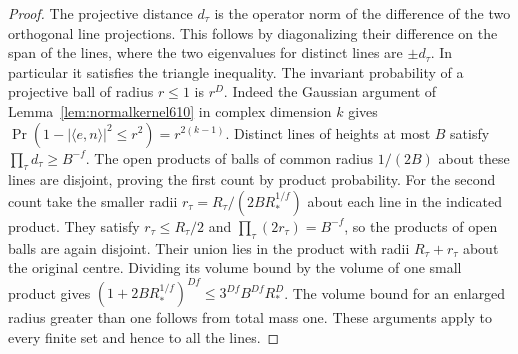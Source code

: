 \documentclass[a4paper,11pt]{article}
\theoremstyle{definition}
\theoremstyle{remark}
\numberwithin{equation}{section}
\begin{document}
\begin{proof}
The projective distance \(d_\tau\) is the operator norm of the
difference of the two orthogonal line projections. This follows
by diagonalizing their difference on the span of the lines,
where the two eigenvalues for distinct lines are \(\pm d_\tau\).
In particular it satisfies the triangle inequality. The invariant
probability of a projective ball of radius \(r\le1\) is \(r^D\).
Indeed the Gaussian argument of Lemma~\ref{lem:normalkernel610}
in complex dimension \(k\) gives
\(\Pr(1-|\langle e,n\rangle|^2\le r^2)=r^{2(k-1)}\).
Distinct lines of heights at most \(B\) satisfy
\(\prod_\tau d_\tau\ge B^{-f}\). The open products of balls of
common radius \(1/(2B)\) about these lines are disjoint, proving
the first count by product probability. For the second count take
the smaller radii \(r_\tau=R_\tau/(2B R_*^{1/f})\) about each
line in the indicated product. They satisfy \(r_\tau\le R_\tau/2\)
and \(\prod_\tau(2r_\tau)=B^{-f}\), so the products of open balls
are again disjoint. Their union lies in the product with radii
\(R_\tau+r_\tau\) about the original centre. Dividing its volume
bound by the volume of one small product gives
\((1+2B R_*^{1/f})^{Df}\le 3^{Df}B^{Df}R_*^D\).
The volume bound for an enlarged radius greater than one follows
from total mass one. These arguments apply to every finite set
and hence to all the lines.
\end{proof}
\end{document}
